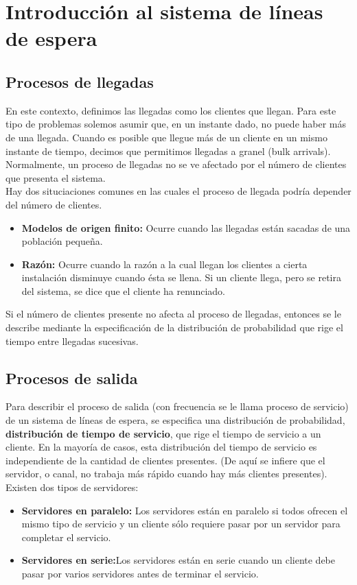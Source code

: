 

\section{Introducción al sistema de líneas de espera}
\subsection{Procesos de llegadas}
En este contexto, definimos las llegadas como los clientes que llegan. Para este tipo de problemas solemos asumir que, en un instante dado, no puede haber más de una llegada. Cuando es posible que llegue más de un cliente en un mismo instante de tiempo, decimos que permitimos llegadas a granel (bulk arrivals).\\
Normalmente, un proceso de llegadas no se ve afectado por el número de clientes que presenta el sistema.\\
Hay dos situciaciones comunes en las cuales el proceso de llegada podría depender del número de clientes.
\begin{itemize}
	\item \textbf{Modelos de origen finito:} Ocurre cuando las llegadas están sacadas de una población pequeña.
	\item \textbf{Razón:} Ocurre cuando la razón a la cual llegan los clientes a cierta instalación disminuye cuando ésta se llena. Si un cliente llega, pero se retira del sistema, se dice que el cliente ha renunciado.
\end{itemize} 

Si el número de clientes presente no afecta al proceso de llegadas, entonces se le describe mediante la especificación de la distribución de probabilidad que rige el tiempo entre llegadas sucesivas.

\subsection{Procesos de salida}
Para describir el proceso de salida (con frecuencia se le llama proceso de servicio) de un sistema de líneas de espera, se especifica una distribución de probabilidad, \textbf{distribución de tiempo de servicio}, que rige el tiempo de servicio a un cliente. En la mayoría de casos, esta distribución del tiempo de servicio es independiente de la cantidad de clientes presentes. (De aquí se infiere que el servidor, o canal, no trabaja más rápido cuando hay más clientes presentes).
\\ Existen dos tipos de servidores:
\begin{itemize}
	\item \textbf{Servidores en paralelo:} Los servidores están en paralelo si todos ofrecen el mismo tipo de servicio y un cliente sólo requiere pasar por un servidor para completar el servicio.
	\item\textbf{Servidores en serie:}Los servidores están en serie cuando un cliente debe pasar por varios servidores antes de terminar el servicio.
\end{itemize}
